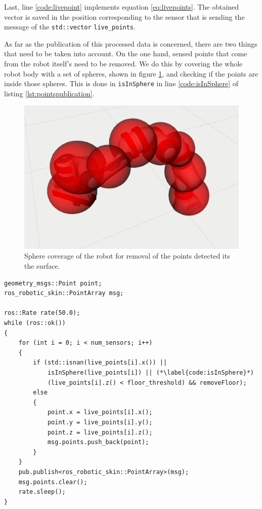 Last, line \ref{code:livepoint} implements equation \ref{eq:livepoints}. The obtained vector is saved in the position corresponding to the sensor that is sending the message of the \lstinline{std::vector} \lstinline{live_points}.

As far as the publication of this processed data is concerned, there are two things that need to be taken into account. On the one hand, sensed points that come from the robot itself's need to be removed. We do this by covering the whole robot body with a set of spheres, shown in figure \ref{fig:spheres}, and checking if the points are inside those spheres. This is done in \lstinline{isInSphere} in line \ref{code:isInSphere} of listing \ref{lst:pointspublication}.

\begin{figure}[H]
    \caption[Spheres]{
    Sphere coverage of the robot for removal of the points detected its the surface.
    }
    \begin{center}
    \includegraphics[width=120mm]{figs/spheres.png}
    \end{center}
\label{fig:spheres}
\end{figure}

\begin{lstlisting}[caption={Body and floor points removal and publication \textit{C++} algorithm.},label={lst:pointspublication},captionpos=b]
geometry_msgs::Point point;
ros_robotic_skin::PointArray msg;

ros::Rate rate(50.0);
while (ros::ok())
{
    for (int i = 0; i < num_sensors; i++)
    {
        if (std::isnan(live_points[i].x()) ||
            isInSphere(live_points[i]) || (*\label{code:isInSphere}*)
            (live_points[i].z() < floor_threshold) && removeFloor);
        else
        {
            point.x = live_points[i].x();
            point.y = live_points[i].y();
            point.z = live_points[i].z();
            msg.points.push_back(point);
        }
    }
    pub.publish<ros_robotic_skin::PointArray>(msg);
    msg.points.clear();
    rate.sleep();
}
\end{lstlisting}

